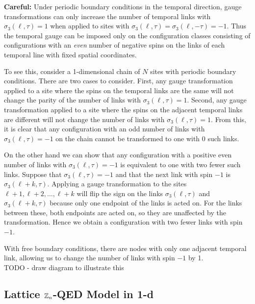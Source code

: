 \documentclass[10pt,reqno]{amsart}
\begin{document}
	
	\textbf{Careful:} Under periodic boundary conditions in the temporal direction, gauge transformations can only increase the number of temporal links with $\sigma_3(\ell,\tau)=1$ when applied to sites with $\sigma_3(\ell,\tau)=\sigma_3(\ell,-\tau)=-1$.
	Thus the temporal gauge can be imposed only on the configuration classes consisting of configurations with an \emph{even} number of negative spins on the links of each temporal line with fixed spatial coordinates.
	
	To see this, consider a 1-dimensional chain of $N$ sites with periodic boundary conditions. 
	There are two cases to consider.
	First, any gauge transformation applied to a site where the spins on the temporal links are the same will not change the parity of the number of links with $\sigma_3(\ell,\tau)=1$.
	Second, any gauge transformation applied to a site where the spins on the adjacent temporal links are different will not change the number of links with $\sigma_3(\ell,\tau)=1$.
	From this, it is clear that any configuration with an odd number of links with $\sigma_3(\ell,\tau)=-1$ on the chain cannot be transformed to one with 0 such links.
	
	On the other hand we can show that any configuration with a positive even number of links with $\sigma_3(\ell,\tau)=-1$ is equivalent to one with two fewer such links.
	Suppose that $\sigma_3(\ell,\tau)=-1$ and that the next link with spin $-1$ is $\sigma_3(\ell+k,\tau)$.
	Applying a gauge transformation to the sites $\ell+1,\ell+2,\ldots, \ell+k$ will flip the sign on the links $\sigma_3(\ell,\tau)$ and $\sigma_3(\ell+k,\tau)$ because only one endpoint of the links is acted on.
	For the links between these, both endpoints are acted on, so they are unaffected by the transformation.
	Hence we obtain a configuration with two fewer links with spin $-1$.
	
	With free boundary conditions, there are nodes with only one adjacent temporal link, allowing us to change the number of links with spin $-1$ by 1. \\
	
	TODO - draw diagram to illustrate this
	
	\subsection{Lattice $\mathbb{Z}_n$-QED Model in 1-d}
	
\end{document}
